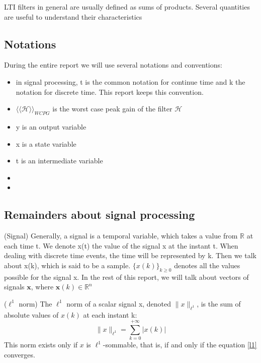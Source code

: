 	LTI filters in general are usually defined as sums of products.
	Several quantities are useful to understand their characteristics

	\subsection{Notations}
		During the entire report we will use several notations and conventions:
		\begin{itemize}
			\item in signal processing, t is the common notation for continue time and k the notation for discrete time. This report keeps this convention.
			\item $\langle\langle\mathcal{H}\rangle\rangle _{WCPG}$ is the worst case peak gain of the filter $\mathcal{H}$
			\item y is an output variable
			\item x is a state variable
			\item t is an intermediate variable
			\item
			\item
		\end{itemize}
	\subsection{Remainders about signal processing}
	\begin{thdef}\label{sig} (Signal)
		Generally, a signal is a temporal variable, which takes a value from $\mathbb{R}$ at each time t.
		We denote x(t) the value of the signal x at the instant t.
		When dealing with discrete time events, the time will be represented by k.
		Then we talk about x(k), which is said to be a sample.
		$\{x(k)\}_{k \geq 0}$ denotes all the values possible for the signal x.
		In the rest of this report, we will talk about vectors of signals $\textbf{x}$, where $\textbf{x}(k) \in \mathbb{R}^{n}$
	\end{thdef}

	\begin{thdef}\label{l_1} ($\ell^1$ norm)
		The $\ell^1$ norm of a scalar signal x, denoted $\|x\|_{\ell^1}$, is the sum of absolute values of $x(k)$ at each instant k:
		\begin{equation} \label{l1}
				\|x\|_{\ell^1}=\sum_{k=0}^{+\infty}|x(k)|
		\end{equation}
		This norm exists only if $x$ is $\ell^1$-sommable, that is, if and only if the equation \ref{l1} converges.
	\end{thdef}
	
